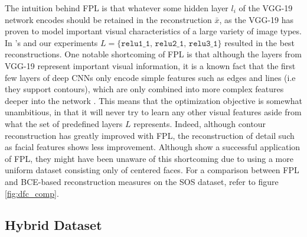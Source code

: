 \documentclass[twocolumn]{article}
\begin{document}
The intuition behind FPL is that whatever some hidden layer \(l_i\) of
the VGG-19 network encodes should be retained in the reconstruction
\(\bar{x}\), as the VGG-19 has proven to model important visual
characteristics of a large variety of image types. In
\citet{hou2017deep}'s and our experiments
\(L = \{\texttt{relu1\_1, relu2\_1, relu3\_1\}}\) resulted in the best
reconstructions. One notable shortcoming of FPL is that although the
layers from VGG-19 represent important visual information, it is a known
fact that the first few layers of deep CNNs only encode simple features
such as edges and lines (i.e they support contours), which are only
combined into more complex features deeper into the network
\citetext{\citealp{liu2017towards}; \citealp[FPL's authors][ note
something similar]{hou2017deep}}. This means that the optimization
objective is somewhat unambitious, in that it will never try to learn
any other visual features \citep[for examples, refer to][Fig.
6.]{liu2017towards} aside from what the set of predefined layers \(L\)
represents. Indeed, although contour reconstruction has greatly improved
with FPL, the reconstruction of detail such as facial features shows
less improvement. Although \citet{hou2017deep} show a successful
application of FPL, they might have been unaware of this shortcoming due
to using a more uniform dataset consisting only of centered faces. For a
comparison between FPL and BCE-based reconstruction measures on the SOS
dataset, refer to figure \ref{fig:dfc_comp}.


\hypertarget{hybrid}{%
\subsection{Hybrid Dataset}\label{hybrid}}
\end{document}
